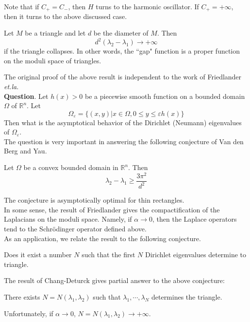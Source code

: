 Note that if $C_+ = C_-$, then $H$ turns to the harmonic oscillator. If
$C_+ = +\infty$, then it turns to the above discussed case.

\begin{theorem}
[Lu-Rowlett] Let $M$ be a triangle and let $d$ be the diameter of $M$. Then
\[
d^2(\lambda_2 - \lambda_1) \rightarrow +\infty
\]
if the triangle collapses. In other words, the ``gap" function is a proper
function on the moduli space of triangles.
\end{theorem}

The original proof of the above result is independent to the work of Friedlander
\textit{et.la.}
\\

\textbf{Question}. Let $h(x) > 0$ be a piecewise smooth function on a bounded
domain $\Omega$ of $\mathbb{R}^n$. Let
\[
\Omega_\varepsilon = \{(x,y)|x\in\Omega, 0\leqslant y\leqslant\varepsilon h(x)\}
\]
Then what is the asymptotical behavior of the Dirichlet (Neumann) eigenvalues of
$\Omega_\varepsilon$.
\\

The question is very important in answering the following conjecture of 
Van den Berg and Yau.
\begin{conjecture}
Let $\Omega$ be a convex bounded domain in $\mathbb{R}^n$. Then
\[
\lambda_2 - \lambda_1 \geqslant \frac{3\pi^2}{d^2}
\]
\end{conjecture}
The conjecture is asymptotically optimal for thin rectangles.
\\

In some sense, the result of Friedlander gives the compactification of the
Laplacians on the moduli space. Namely, if $\alpha\rightarrow 0$, then the
Laplace operators tend to the Schr\"{o}dinger operator defined above.
\\

As an application, we relate the result to the following conjecture.
\begin{conjecture}
Does it exist a number $N$ such that the first $N$ Dirichlet eigenvalues
determine to triangle.
\end{conjecture}

The result of Chang-Deturck gives partial answer to the above conjecture:
\begin{theorem}
There exists $N = N(\lambda_1, \lambda_2)$ such that 
$\lambda_1, \cdots, \lambda_N$ determines the triangle.
\end{theorem}

Unfortunately, if $\alpha\rightarrow 0$, $N = N(\lambda_1,\lambda_2)\rightarrow
+\infty$.
\\

